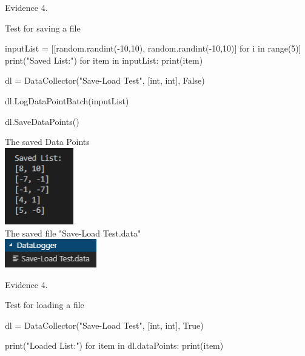 \begin{center}
    {\large Evidence 4.\rn } \\ 
    \vspace{0.3cm}

    Test for saving a file \\
    \begin{pythoncode}
inputList = [[random.randint(-10,10), random.randint(-10,10)] for i in range(5)]
print("Saved List:")
for item in inputList:
print(item)

dl = DataCollector("Save-Load Test", [int, int], False)

dl.LogDataPointBatch(inputList)

dl.SaveDataPoints()
    \end{pythoncode}

    The saved Data Points \\
    \includegraphics[width=3cm]{Images/Testing/T4.8.1.PNG} \\
    The saved file "Save-Load Test.data" \\
    \includegraphics[width=4cm]{Images/Testing/T4.8.2.PNG} \\
    \vspace{1cm}

    {\large Evidence 4.\rn } \\ 
    \vspace{0.3cm}

    Test for loading a file
    \begin{pythoncode}
dl = DataCollector("Save-Load Test", [int, int], True)

print("Loaded List:")
for item in dl.dataPoints:
print(item)
    \end{pythoncode}


\end{center}
